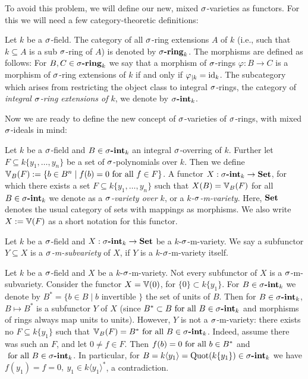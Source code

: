 To avoid this problem, we will define our new, mixed $\sigma$-varieties as functors. For this we will need a few category-theoretic definitions:

\begin{defn}
Let $k$ be a $\sigma$-field. The category of all $\sigma$-ring extensions $A$ of $k$ (i.e., such that $k \subseteq A$ is a sub $\sigma$-ring of $A$) is denoted by $\sringk$. The morphisms are defined as follows: For $B,C \in \sigma\text{{\normalfont\textbf{-ring}}}_k$ we say that a morphism of $\sigma$-rings $\varphi: B \rightarrow C$ is a morphism of $\sigma$-ring extensions of $k$ if and only if $\varphi_{|k} = \text{id}_k$.
The subcategory which arises from restricting the object class to integral $\sigma$-rings, the category of \emph{integral $\sigma$-ring extensions of $k$}, we denote by $\sintk$. \index{$\sintk$} \index{$\sringk$} 
\end{defn}

Now we are ready to define the new concept of $\sigma$-varieties of $\sigma$-rings, with mixed $\sigma$-ideals in mind:

\begin{defn}\label{defnVV}
Let $k$ be a $\sigma$-field and $B \in \sigma\text{{\normalfont\textbf{-int}}}_k$ an integral $\sigma$-overring of $k$. Further let $F \subseteq k\{y_1, \ldots, y_n\}$ be a set of $\sigma$-polynomials over $k$. 
Then we define $\mathbb{V}_B(F):= \{ b \in B^n \mid f(b) = 0 \text{ for all } f \in F \}$. A functor $X: \sigma\text{{\normalfont\textbf{-int}}}_k \rightarrow {\normalfont\textbf{Set}}$, for which there exists a set $F \subseteq k\{y_1, \ldots, y_n \}$ such that $X(B) = \mathbb{V}_B(F)$ for all $B \in \sigma\text{{\normalfont\textbf{-int}}}_k$ we denote as a \emph{$\sigma$-variety over $k$}, or a \emph{$k$-$\sigma$-m-variety}.
Here, ${\normalfont\textbf{Set}}$ denotes the usual category of sets with mappings as morphisms. We also write $X := \mathbb{V}(F)$ as a short notation for this functor.   
\end{defn}

\begin{defn}
Let $k$ be a $\sigma$-field and $X: \sigma\text{{\normalfont\textbf{-int}}}_k \rightarrow {\normalfont\textbf{Set}}$ be a $k$-$\sigma$-m-variety. We say a subfunctor $Y \subseteq X$ is a \emph{$\sigma$-m-subvariety} of $X$, if $Y$ is a $k$-$\sigma$-m-variety itself. 
\end{defn}

 \begin{rem}
Let $k$ be a $\sigma$-field and $X$ be a $k$-$\sigma$-m-variety. Not every subfunctor of $X$ is a $\sigma$-m-subvariety. Consider the functor $X = \mathbb{V}(0)$, for $\{0\} \subset k\{y_1\}$.
For $B \in \sigma\text{{\normalfont\textbf{-int}}}_k$ we denote by $B^* = \{ b \in B \mid b \text{ invertible } \}$ the set of units of $B$. Then for $B \in \sigma\text{{\normalfont\textbf{-int}}}_k$, $B \mapsto B^*$ is a subfunctor $Y$ of $X$ (since $B^* \subset B \text{ for all } B \in \sigma\text{{\normalfont\textbf{-int}}}_k$ and morphisms of rings always map units to units). However, $Y$ is not a $\sigma$-m-variety:
there exists no $F \subseteq k\{y_1\}$ such that $\mathbb{V}_B(F) = B^* \text{ for all } B \in \sigma\text{{\normalfont\textbf{-int}}}_k$.  Indeed, assume there was such an $F$, and let $0 \neq f \in F$. Then $f(b) = 0 \text{ for all } b \in B^*$ and $\text{ for all } B \in \sigma\text{{\normalfont\textbf{-int}}}_k$. In particular,
for $B = k\langle y_1 \rangle = \operatorname{Quot}(k\{y_1\}) \in \sigma\text{{\normalfont\textbf{-int}}}_k$ we have $f(y_1) = f = 0, ~ y_1 \in k \langle y_1 \rangle^*$, a contradiction.  
\end{rem}

